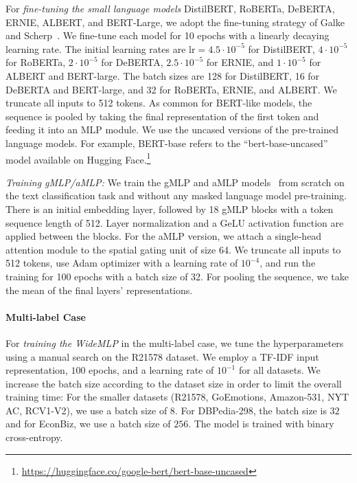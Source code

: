 \documentclass[acmsmall,nonacm]{acmart}
\newcommand{\mlp}{WideMLP\xspace}
\begin{document}
For \textit{fine-tuning the small language models} 
DistilBERT, RoBERTa, DeBERTA, ERNIE, ALBERT, and BERT-Large, we adopt the fine-tuning strategy of Galke and Scherp~\cite{galkescherp-acl2022}.
We fine-tune each model for 10 epochs with a linearly decaying learning rate.
The initial learning rates are $\mathrm{lr}=4.5\cdot 10^{-5}$ for DistilBERT, $4 \cdot 10^{-5}$ for RoBERTa, $2 \cdot 10^{-5}$ for DeBERTA, $2.5 \cdot 10^{-5}$ for ERNIE, and $1 \cdot 10^{-5}$ for ALBERT and BERT-large. The batch sizes are 128 for DistilBERT, 16 for DeBERTA and BERT-large, and 32 for RoBERTa, ERNIE, and ALBERT. 
We truncate all inputs to 512 tokens. 
As common for BERT-like models, the sequence is pooled by taking the final representation of the first token and feeding it into an MLP module. We use the uncased versions of the pre-trained language models.
For example, BERT-base refers to the ``bert-base-uncased'' model available on Hugging Face.\footnote{\url{https://huggingface.co/google-bert/bert-base-uncased}}

\textit{Training gMLP/aMLP:}
We train the gMLP and aMLP models~\cite{DBLP:journals/corr/abs-2105-08050} from scratch on the text classification task and without any masked language model pre-training. There is an initial embedding layer, followed by 18 gMLP blocks with a token sequence length of 512. Layer normalization and a GeLU activation function are applied between the blocks. For the aMLP version, we attach a single-head attention module to the spatial gating unit of size 64.
We truncate all inputs to 512 tokens, use Adam optimizer with a learning rate of $10^{-4}$, and run the training for 100 epochs with a batch size of 32. For pooling the sequence, we take the mean of the final layers' representations.

\paragraph{Multi-label Case}
For \textit{training the \mlp{}} in the multi-label case, we tune the hyperparameters using a manual search on the R21578 dataset. 
We employ a TF-IDF input representation, $100$ epochs, and a learning rate of $10^{-1}$ for all datasets.  We increase the batch size according to the dataset size in order to limit the overall training time:
For the smaller datasets (R21578, GoEmotions, Amazon-531, NYT AC, RCV1-V2), we use a batch size of 8. 
For DBPedia-298, the batch size is $32$ and for EconBiz, we use a batch size of $256$. 
The model is trained with binary cross-entropy. 
\end{document}
